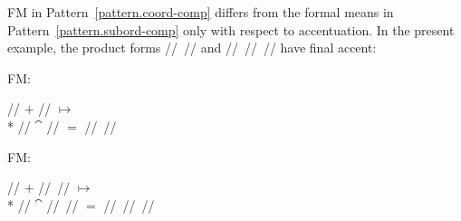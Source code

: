 \documentclass[output=paper
  ,nobabel
  ,draftmode
  ,colorlinks, citecolor=brown
]{langscibook}
\begin{document}
FM in Pattern \ref{pattern.coord-comp} differs from
the formal means in Pattern \ref{pattern.subord-comp}
only with respect to accentuation. In the present example, the product forms
// // and \mbox{//} // // have final accent: \begin{exe}
\ex \begin{xlist}
\ex \raggedright
\begin{labeledlist}{FM:}
\item[FM:] \raggedright // $+$ // $↦$\\*{}
// $⁀$ // $=$ // //
\end{labeledlist}
\ex \raggedright
\begin{labeledlist}{FM:}
\item[FM:] \raggedright // $+$ // // $↦$\\*{}
// $⁀$ // // $=$ // // //
\end{labeledlist}
\end{xlist}
\end{exe}
\end{document}
